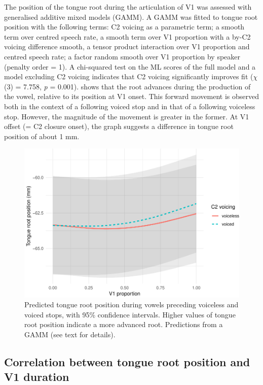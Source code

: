 \documentclass[12pt,]{article}
\begin{document}
\label{s:trp-v1}

The position of the tongue root during the articulation of V1 was
assessed with generalised additive mixed models (GAMM). A GAMM was
fitted to tongue root position with the following terms: C2 voicing as a
parametric term; a smooth term over centred speech rate, a smooth term
over V1 proportion with a by-C2 voicing difference smooth, a tensor
product interaction over V1 proportion and centred speech rate; a factor
random smooth over V1 proportion by speaker (penalty order = 1). A
chi-squared test on the ML scores of the full model and a model
excluding C2 voicing indicates that C2 voicing significantly improves
fit (\(\chi\)(3) = 7.758, \emph{p} = 0.001).  shows
that the root advances during the production of the vowel, relative to
its position at V1 onset. This forward movement is observed both in the
context of a following voiced stop and in that of a following voiceless
stop. However, the magnitude of the movement is greater in the former.
At V1 offset (= C2 closure onset), the graph suggests a difference in
tongue root position of about 1 mm.

\begin{figure}
\includegraphics[width=\linewidth]{2018-tra_files/figure-latex/tra-gam-plot-1} \caption{Predicted tongue root position during vowels preceding voiceless and voiced stops, with 95\% confidence intervals. Higher values of tongue root position indicate a more advanced root. Predictions from a GAMM (see text for details).}\label{f:tra-gam-plot}
\end{figure}

\hypertarget{correlation-between-tongue-root-position-and-v1-duration}{%
\subsection{Correlation between tongue root position and V1
duration}\label{correlation-between-tongue-root-position-and-v1-duration}}
\end{document}
